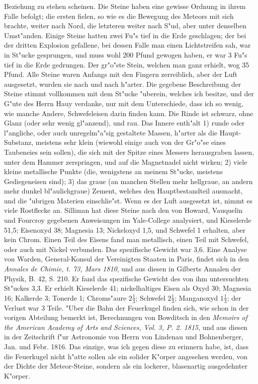 \documentclass[a4paper, 11pt, oneside, polutonikogreek, german]{article}
\begin{document}
Beziehung zu stehen scheinen. Die Steine haben eine gewisse Ordnung in ihrem Falle befolgt; die ersten fielen, so wie es die Bewegung des Meteors mit sich brachte, weiter nach Nord, die letzteren weiter nach S"ud, aber unter denselben Umst"anden. Einige Steine hatten zwei Fu"s tief in die Erde geschlagen; der bei der dritten Explosion gefallene, bei dessen Falle man einen Lichtstreifen sah, war in St"ucke gesprungen, und muss wohl 200 Pfund gewogen haben, er war 3 Fu"s tief in die Erde gedrungen. Der gr"o"ste Stein, welchen man ganz erhielt, wog 35 Pfund. Alle Steine waren Anfangs mit den Fingern zerreiblich, aber der Luft ausgesetzt, wurden sie nach und nach h"arter. Die gegebene Beschreibung der Steine stimmt vollkommen mit dem St"ucke "uberein, welches ich besitze, und der G"ute des Herrn Hauy verdanke, nur mit dem Unterschiede, dass ich so wenig, wie manche Andere, Schwefeleisen darin finden kann. Die Rinde ist schwarz, ohne Glanz (oder sehr wenig gl"anzend), und rau. Das Innere enth"alt 1) runde oder l"angliche, oder auch unregelm"a"sig gestaltete Massen, h"arter als die Haupt-Substanz, meistens sehr klein (wiewohl einige auch von der Gr"o"se eines Taubeneies sein sollen), die sich mit der Spitze eines Messers herausgraben lassen, unter dem Hammer zerspringen, und auf die Magnetnadel nicht wirken; 2) viele kleine metallische Punkte (die, wenigstens an meinem St"ucke, meistens Gediegeneisen sind); 3) das graue (an manchen Stellen mehr hellgraue, an andern mehr dunkel bl"aulichgraue) Zement, welches den Hauptbestandteil ausmacht, und die "ubrigen Materien einschlie"st. Wenn es der Luft ausgesetzt ist, nimmt es viele Rostflecke an. Silliman hat diese Steine nach den von Howard, Vauquelin und Fourcroy gegebenen Anweisungen im Yale-College analysiert, und Kieselerde 51,5; Eisenoxyd 38; Magnesia 13; Nickeloxyd 1,5, und Schwefel 1 erhalten, aber kein Chrom. Einen Teil des Eisens fand man metallisch, einen Teil mit Schwefel, oder auch mit Nickel verbunden. Das spezifische Gewicht war 3,6. Eine Analyse von Warden, General-Konsul der Vereinigten Staaten in Paris, findet sich in den \emph{Annales de Chimie, t. 73, Mars 1810}, und aus diesen in Gilberts Annalen der Physik, B. 42, S. 210. Er fand das spezifische Gewicht des von ihm untersuchten St"uckes 3,3. Er erhielt Kieselerde 41; nickelhaltiges Eisen als Oxyd 30; Magnesia 16; Kalkerde 3; Tonerde 1; Chroms"aure $\mathfrak{2\frac{1}{3}}$; Schwefel $\mathfrak{2\frac{1}{3}}$; Manganoxyd $\mathfrak{1\frac{1}{3}}$; der Verlust war 3 Teile. "Uber die Bahn der Feuerkugel finden sich, wie schon in der vorigen Abteilung bemerkt ist, Berechnungen von Bowditsch in den \emph{Memoirs of the American Academy of Arts and Sciences, Vol. 3, P. 2. 1815}, und aus diesen in der Zeitschrift f"ur Astronomie von Herrn von Lindenau und Bohnenberger, Jan. und Febr. 1816. Das einzige, was ich gegen diese zu erinnern habe, ist, dass die Feuerkugel nicht h"atte sollen als ein solider K"orper angesehen werden, von der Dichte der Meteor-Steine, sondern als ein lockerer, blasenartig ausgedehnter K"orper.
\end{document}
